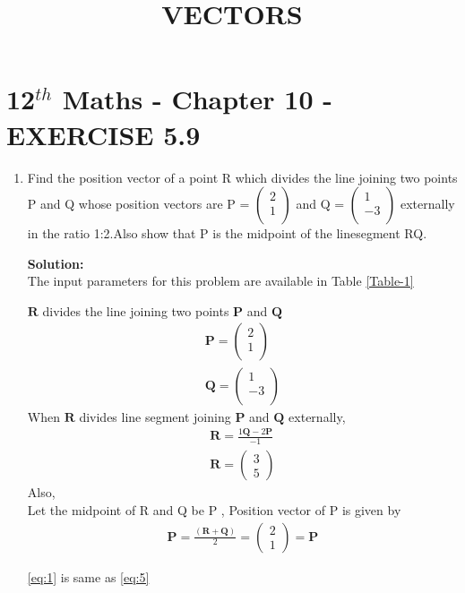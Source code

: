 \documentclass[12pt]{article}
\let\vec\mathbf
\newcommand{\solution}{\noindent \textbf{Solution: }}
\newcommand{\myvec}[1]{\ensuremath{\begin{pmatrix}#1\end{pmatrix}}}
\let\vec\mathbf{}
\begin{document}
\begin{center}
\title{\textbf{VECTORS}}
\date{\vspace{-5ex}} %
\maketitle
\end{center}
\setcounter{page}{1}
\section*{12$^{th}$ Maths - Chapter 10 - EXERCISE 5.9}

\begin{enumerate}

       \item Find the position vector of a point R which divides the line joining two points  P and Q whose position vectors are P = \myvec{2\\ 1 \\} and Q = \myvec{ 1\\-3\\ }  externally in the ratio 1:2.Also show that P is the midpoint of the linesegment RQ.

\solution \\The input parameters for this problem are available in Table \ref{Table-1}
\begin{table}[ht!]

\caption{}
\label{Table-1}	
\end{table}
	
$\vec{R}$ divides the line joining two points $\vec{P}$ and $\vec{Q}$ 
\begin{align}
\vec{P} = \myvec{ 2\\1\\} 
\label{eq:eq:1} \\
\vec{Q} = \myvec{ 1\\-3\\}
\end{align}
When $\vec{R}$ divides line segment joining $\vec{P}$ and $\vec{Q}$ externally,
\begin{align}
	\vec{R} = \frac{1\vec{Q}-2\vec{P}}{-1}\\
	\vec{R} = \myvec{3\\5}
\end{align}	
Also,\\
Let the midpoint of R and Q be P , Position vector of P is given by
\begin{align}
	\vec{P}=\frac{(\vec{R} + \vec{Q})}{2} 
	=\myvec{2\\1}=\vec{P}
	\label{eq:eq:5}
\end{align}
		
			\eqref{eq:1} is same as \eqref{eq:5}\\
		

\end{enumerate}
\end{document}
